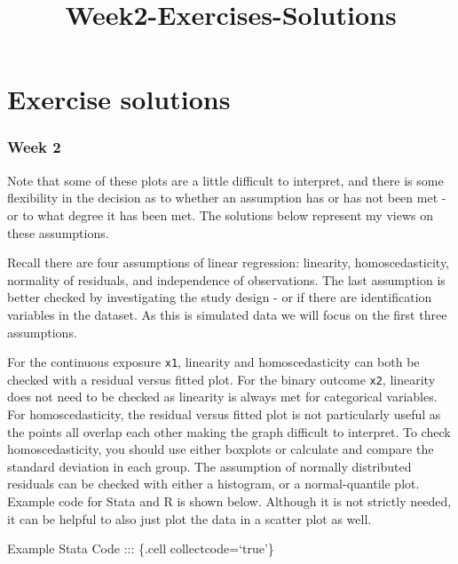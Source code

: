 \documentclass[
  letterpaper,
  DIV=11,
  numbers=noendperiod]{scrreprt}
\title{Week2-Exercises-Solutions}
\author{}
\date{}
\begin{document}
\maketitle


\chapter{Exercise solutions}\label{exercise-solutions}

\subsection*{Week 2}\label{week-2}

Note that some of these plots are a little difficult to interpret, and
there is some flexibility in the decision as to whether an assumption
has or has not been met - or to what degree it has been met. The
solutions below represent my views on these assumptions.

Recall there are four assumptions of linear regression: linearity,
homoscedasticity, normality of residuals, and independence of
observations. The last assumption is better checked by investigating the
study design - or if there are identification variables in the dataset.
As this is simulated data we will focus on the first three assumptions.

For the continuous exposure \texttt{x1}, linearity and homoscedasticity
can both be checked with a residual versus fitted plot. For the binary
outcome \texttt{x2}, linearity does not need to be checked as linearity
is always met for categorical variables. For homoscedasticity, the
residual versus fitted plot is not particularly useful as the points all
overlap each other making the graph difficult to interpret. To check
homoscedasticity, you should use either boxplots or calculate and
compare the standard deviation in each group. The assumption of normally
distributed residuals can be checked with either a histogram, or a
normal-quantile plot. Example code for Stata and R is shown below.
Although it is not strictly needed, it can be helpful to also just plot
the data in a scatter plot as well.

Example Stata Code ::: \{.cell collectcode=`true'\}
\end{document}
